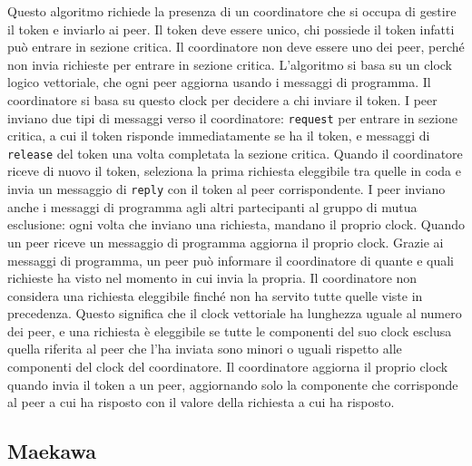 \documentclass[conference]{IEEEtran}
\begin{document}
Questo algoritmo richiede la presenza di un coordinatore che si occupa di gestire il token e inviarlo ai peer. Il token deve essere unico, chi possiede il token infatti può entrare in sezione critica. Il coordinatore non deve essere uno dei peer, perché non invia richieste per entrare in sezione critica. L'algoritmo si basa su un clock logico vettoriale, che ogni peer aggiorna usando i messaggi di programma. Il coordinatore si basa su questo clock per decidere a chi inviare il token. I peer inviano due tipi di messaggi verso il coordinatore: \verb|request| per entrare in sezione critica, a cui il token risponde immediatamente se ha il token, e messaggi di \verb|release| del token una volta completata la sezione critica. Quando il coordinatore riceve di nuovo il token, seleziona la prima richiesta eleggibile tra quelle in coda e invia un messaggio di \verb|reply| con il token al peer corrispondente. I peer inviano anche i messaggi di programma agli altri partecipanti al gruppo di mutua esclusione: ogni volta che inviano una richiesta, mandano il proprio clock. Quando un peer riceve un messaggio di programma aggiorna il proprio clock. Grazie ai messaggi di programma, un peer può informare il coordinatore di quante e quali richieste ha visto nel momento in cui invia la propria. Il coordinatore non considera una richiesta eleggibile finché non ha servito tutte quelle viste in precedenza. Questo significa che il clock vettoriale ha lunghezza uguale al numero dei peer, e una richiesta è eleggibile se tutte le componenti del suo clock esclusa quella riferita al peer che l'ha inviata sono minori o uguali rispetto alle componenti del clock del coordinatore. Il coordinatore aggiorna il proprio clock quando invia il token a un peer, aggiornando solo la componente che corrisponde al peer a cui ha risposto con il valore della richiesta a cui ha risposto.

\subsection{Maekawa}
\end{document}

